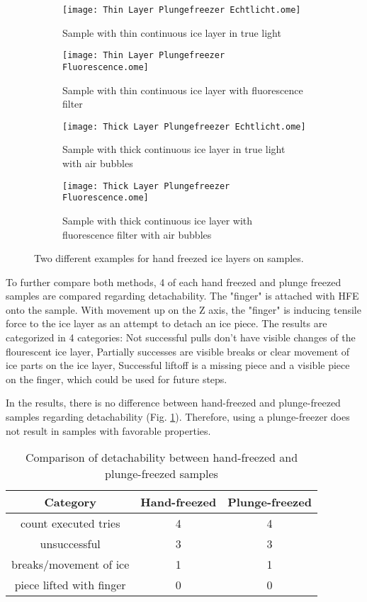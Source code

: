 \begin{figure}[hbt!]
	\centering
	\begin{subfigure}[]{0.45\textwidth}
		\centering
		\texttt{[image: Thin Layer Plungefreezer Echtlicht.ome]}
		\caption{Sample with thin continuous ice layer in true light \newline}
	\end{subfigure}
	\begin{subfigure}[]{0.45\textwidth}
		\centering
		\texttt{[image: Thin Layer Plungefreezer Fluorescence.ome]}
		\caption{Sample with thin continuous ice layer with fluorescence filter}
	\end{subfigure}
	\begin{subfigure}[]{0.45\textwidth}
		\centering
		\texttt{[image: Thick Layer Plungefreezer Echtlicht.ome]}
		\caption{Sample with thick continuous ice layer in true light with air bubbles}
	\end{subfigure}
	\begin{subfigure}[]{0.45\textwidth}
		\centering
		\texttt{[image: Thick Layer Plungefreezer Fluorescence.ome]}
		\caption{Sample with thick continuous ice layer with fluorescence filter with air bubbles}
	\end{subfigure}
	\caption{Two different examples for hand freezed ice layers on samples. }
	\label{fig:VglMachineFreeze}
\end{figure}

To further compare both methods, 4 of each hand freezed and plunge freezed samples are compared regarding detachability. The "finger" is attached with HFE onto the sample. With movement up on the Z axis, the "finger" is inducing tensile force to the ice layer as an attempt to detach an ice piece. The results are categorized in 4 categories: Not successful pulls don't have visible changes of the flourescent ice layer, Partially successes are visible breaks or clear movement of ice parts on the ice layer, Successful liftoff is a missing piece and a visible piece on the finger, which could be used for future steps.

In the results, there is no difference between hand-freezed and plunge-freezed samples regarding detachability (Fig. \ref{table:AttemptsHandsvsMachine}). Therefore, using a plunge-freezer does not result in samples with favorable properties.

\begin{table}
	\centering
	\begin{tabular}{|c|c|c|}
		\hline
		Category & Hand-freezed & Plunge-freezed \\
		\hline
		\hline
		count executed tries & 4 & 4\\
		\hline
		unsuccessful & 3 & 3\\
		\hline
		breaks/movement of ice & 1 & 1\\
		\hline
		piece lifted with finger & 0 & 0\\
		\hline		
	\end{tabular}
	\caption{Comparison of detachability between hand-freezed and plunge-freezed samples}
	\label{table:AttemptsHandsvsMachine}
\end{table}

